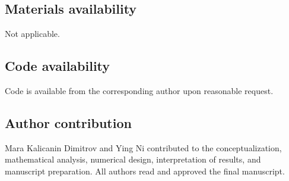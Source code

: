 \documentclass[pdflatex,sn-mathphys-num]{sn-jnl}
\theoremstyle{thmstyleone}%
\theoremstyle{thmstylethree}%
\theoremstyle{thmstyletwo}%
\begin{document}
\subsection*{Materials availability}
Not applicable.

\subsection*{Code availability}
Code is available from the corresponding author upon reasonable request.

\subsection*{Author contribution}
Mara Kalicanin Dimitrov and Ying Ni contributed to the conceptualization, mathematical analysis, numerical design, interpretation of results, and manuscript preparation. All authors read and approved the final manuscript.
\end{document}
